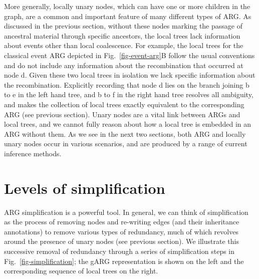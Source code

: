 \documentclass{article}
\newcommand{\noderef}[1]{\textsf{#1}}
\begin{document}
More generally, locally unary nodes,
which can have one or more children in the graph,
are a common and important feature
of many different types of ARG.
As discussed in the previous section,
without these nodes marking the passage
of ancestral material through specific ancestors, the local trees
lack information about events other than local coalescence.
For example, the local trees for the classical event ARG
depicted in Fig.~\ref{fig-event-arg}B follow the usual conventions
and do not include any information about the recombination
that occurred at node \noderef{d}. Given these two local trees
in isolation
we lack specific information about the recombination.
Explicitly recording that node \noderef{d} lies on the
branch joining \noderef{b} to \noderef{e} in the left hand
tree, and \noderef{b} to \noderef{f} in the right hand tree
resolves all ambiguity, and makes the collection of local
trees exactly equivalent to the corresponding ARG (see previous section).
Unary nodes are a vital link between ARGs and local trees, and we
cannot fully reason about how a local tree is embedded in an ARG
without them. As we see in the next two sections, both ARG and locally
unary nodes occur in various scenarios, and are
produced by a range of current inference methods.

\section{Levels of simplification}
\label{sec-ARG-simplification}
ARG simplification is a powerful tool.
In general, we can think of
simplification as the process
of removing nodes and re-writing edges (and their inheritance annotations)
to remove various types of redundancy, much of which
revolves around the presence of unary nodes (see previous section).
We illustrate this successive removal of redundancy
through a series of simplification steps
in Fig.~\ref{fig-simplification};
the gARG representation is shown on the left and the corresponding sequence
of local trees on the right.
\end{document}
